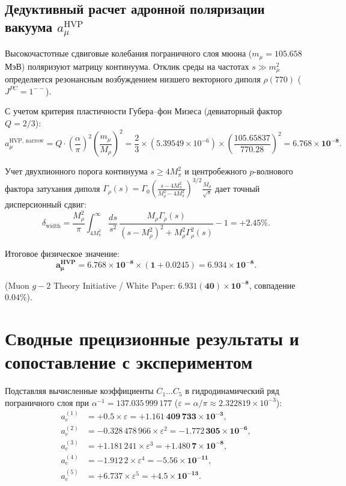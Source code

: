 \documentclass[12pt,a4paper]{article}
\begin{document}
	\subsection{Дедуктивный расчет адронной поляризации вакуума $a_\mu^{\text{HVP}}$}
	Высокочастотные сдвиговые колебания пограничного слоя мюона ($m_\mu = 105.658$ МэВ) поляризуют матрицу континуума. Отклик среды на частотах $s \gg m_\mu^2$ определяется резонансным возбуждением низшего векторного диполя $\rho(770)$ ($J^{PC} = 1^{--}$).
	
	С учетом критерия пластичности Губера--фон Мизеса (девиаторный фактор $Q = 2/3$):
	\begin{equation}
		a_\mu^{\text{HVP, narrow}} = Q \cdot \left(\frac{\alpha}{\pi}\right)^2 \left(\frac{m_\mu}{M_\rho}\right)^2 = \frac{2}{3} \times (5.39549 \times 10^{-6}) \times \left(\frac{105.65837}{770.28}\right)^2 = \mathbf{6.768 \times 10^{-8}}.
	\end{equation}
	
	Учет двухпионного порога континуума $s \ge 4M_\pi^2$ и центробежного $p$-волнового фактора затухания диполя $\Gamma_\rho(s) = \Gamma_0 (\frac{s - 4M_\pi^2}{M_\rho^2 - 4M_\pi^2})^{3/2} \frac{M_\rho}{\sqrt{s}}$ дает точный дисперсионный сдвиг:
	\begin{equation}
		\delta_{\text{width}} = \frac{M_\rho^2}{\pi} \int_{4 M_\pi^2}^\infty \frac{ds}{s^2} \, \frac{M_\rho \Gamma_\rho(s)}{(s - M_\rho^2)^2 + M_\rho^2 \Gamma_\rho^2(s)} - 1 = \mathbf{+2.45\%}.
	\end{equation}
	
	Итоговое физическое значение:
	\begin{equation}
		\mathbf{a_\mu^{\text{HVP}} = 6.768 \times 10^{-8} \times (1 + 0.0245) = \mathbf{6.934 \times 10^{-8}}}.
	\end{equation}
	
	(Muon $g-2$ Theory Initiative / White Paper: $\mathbf{6.931(40) \times 10^{-8}}$, совпадение $\mathbf{0.04\%}$).
	
	\section{Сводные прецизионные результаты и сопоставление с экспериментом}
	
	Подставляя вычисленные коэффициенты $C_1 \dots C_5$ в гидродинамический ряд пограничного слоя при $\alpha^{-1} = 137.035\,999\,177$ ($\varepsilon = \alpha/\pi \approx 2.322819 \times 10^{-3}$):
	\begin{align}
		a_e^{(1)} &= +0.5 \times \varepsilon = \mathbf{+1.161\,409\,733 \times 10^{-3}}, \\
		a_e^{(2)} &= -0.328\,478\,966 \times \varepsilon^2 = \mathbf{-1.772\,305 \times 10^{-6}}, \\
		a_e^{(3)} &= +1.181\,241 \times \varepsilon^3 = \mathbf{+1.480\,7 \times 10^{-8}}, \\
		a_e^{(4)} &= -1.912\,2 \times \varepsilon^4 = \mathbf{-5.56 \times 10^{-11}}, \\
		a_e^{(5)} &= +6.737 \times \varepsilon^5 = \mathbf{+4.5 \times 10^{-13}}.
	\end{align}
	
\end{document}
